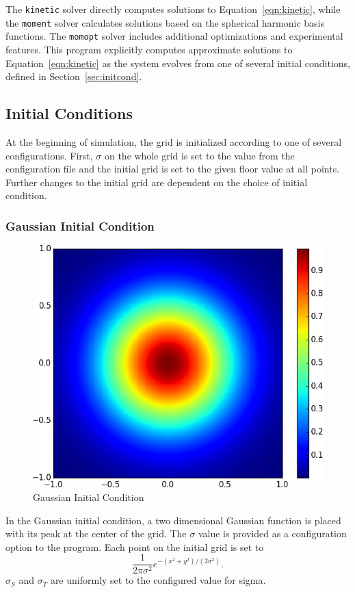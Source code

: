 \documentclass{article}
\newcommand{\kinetic}{\texttt{kinetic}\xspace}
\newcommand{\moment}{\texttt{moment}\xspace}
\newcommand{\momopt}{\texttt{momopt}\xspace}
\begin{document}
The \kinetic solver directly computes solutions to
Equation~\ref{eqn:kinetic}, while the \moment solver calculates solutions based on
the spherical harmonic basis functions. The \momopt solver includes additional
optimizations and experimental features. This program explicitly computes approximate
solutions to Equation~\ref{eqn:kinetic} as
the system evolves from one of several initial conditions, defined in
Section~\ref{sec:initcond}.

\subsection{Initial Conditions}
\label{subsec:initcond}
\FloatBarrier
At the beginning of simulation, the grid is initialized according to one of several
configurations. First, $\sigma$ on the whole grid is set to the value from
the configuration file and the initial grid is set to the given floor value at
all points. Further changes to the initial grid are dependent on the choice
of initial condition.

\subsubsection{Gaussian Initial Condition}
\begin{figure}
    \centering
    \includegraphics[height=0.3\textheight]{initcond_gaussian.png}
    \caption{Gaussian Initial Condition}
\end{figure}
In the Gaussian initial condition, a two dimensional Gaussian function
is placed with its peak at the center of the grid. The $\sigma$ value
is provided as a configuration option to the program. Each point on the
initial grid is set to
\begin{equation}
    \frac{1}{2 \pi \sigma^2} e^{-(x^2 + y^2) / (2 \sigma^2)}.
\end{equation}
$\sigma_S$ and $\sigma_T$ are uniformly set to the configured
value for sigma.
\end{document}

